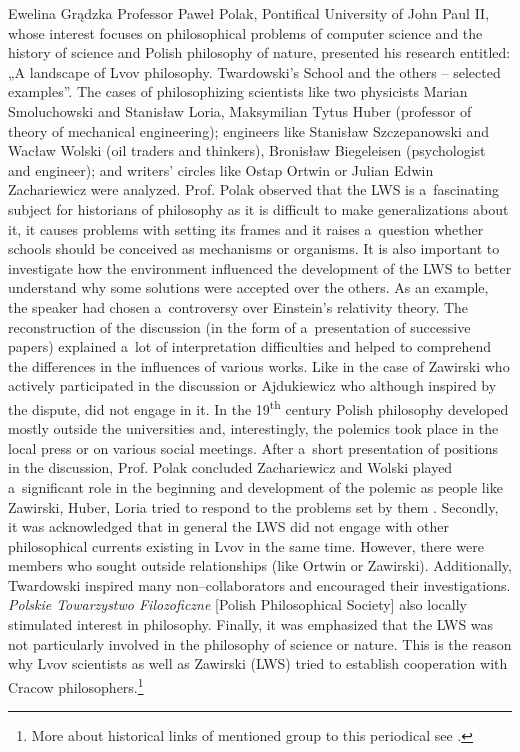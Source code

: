 \begin{editorialeng}{Ewelina Grądzka}
Professor Paweł Polak, Pontifical University of John Paul II, whose interest focuses on philosophical problems of computer science and the history of science and Polish philosophy of nature, presented his research entitled: „A landscape of Lvov philosophy. Twardowski’s School and the others -- selected examples”. The cases of philosophizing scientists like two physicists Marian Smoluchowski and Stanisław Loria, Maksymilian Tytus Huber (professor of theory of mechanical engineering); engineers like Stanisław Szczepanowski and Wacław Wolski (oil traders and thinkers), Bronisław Biegeleisen (psychologist and engineer); and writers’ circles like Ostap Ortwin or Julian Edwin Zachariewicz were analyzed. Prof. Polak observed that the LWS is a~fascinating subject for historians of philosophy as it is difficult to make generalizations about it, it causes problems with setting its frames and it raises a~question whether schools should be conceived as mechanisms or organisms. It is also important to investigate how the environment influenced the development of the LWS to better understand why some solutions were accepted over the others. As an example, the speaker had chosen a~controversy over Einstein’s relativity theory. The reconstruction of the discussion (in the form of a~presentation of successive papers) explained a~lot of interpretation difficulties and helped to comprehend the differences in the influences of various works. Like in the case of Zawirski who actively participated in the discussion or Ajdukiewicz who although inspired by the dispute, did not engage in it. In the 19\textsuperscript{th} century Polish philosophy developed mostly outside the universities and, interestingly, the polemics took place in the local press or on various social meetings. After a~short presentation of positions in the discussion, Prof. Polak concluded Zachariewicz and Wolski played a~significant role in the beginning and development of the polemic as people like Zawirski, Huber, Loria tried to respond to the problems set by them
\parencite[see also][]{polak_philosophy_2016}. %
 Secondly, it was acknowledged that in general the LWS did not engage with other philosophical currents existing in Lvov in the same time. However, there were members who sought outside relationships (like Ortwin or Zawirski). Additionally, Twardowski inspired many non--collaborators and encouraged their investigations. \textit{Polskie Towarzystwo Filozoficzne} [Polish Philosophical Society] also locally stimulated interest in philosophy. Finally, it was emphasized that the LWS was not particularly involved in the philosophy of science or nature. This is the reason why Lvov scientists as well as Zawirski (LWS) tried to establish cooperation with Cracow philosophers.\footnote{ More about historical links of mentioned group to this periodical see 
\parencite[][]{trombik_origin_2019}.%
}


\end{editorialeng}

